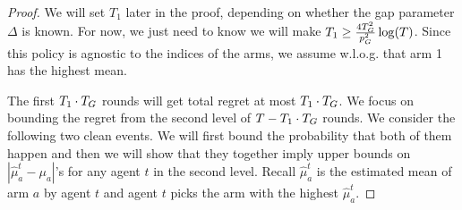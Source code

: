 





\begin{proof}
  We will set $T_1$ later in the proof, depending on whether the gap
  parameter $\Delta$ is known. For now, we just need to know we will
  make $T_1 \geq \frac{4T_G^2}{p_G^2}\log(T)$. Since this policy is
  agnostic to the indices of the arms, we assume w.l.o.g. that arm 1
  has the highest mean.

  The first $T_1 \cdot T_G$ rounds will get total regret at most
  $T_1 \cdot T_G$.  We focus on bounding the regret from the second
  level of $T - T_1 \cdot T_G$ rounds. We consider the following two
  clean events. We will first bound the probability that both of them
  happen and then we will show that they together imply upper bounds
  on $|\hat{\mu}^t_a - \mu_a|$'s for any agent $t$ in the second
  level. Recall $\hat{\mu}^t_a$ is the estimated mean of arm $a$ by
  agent $t$ and agent $t$ picks the arm with the highest
  $\hat{\mu}^t_a$.


\end{proof}
